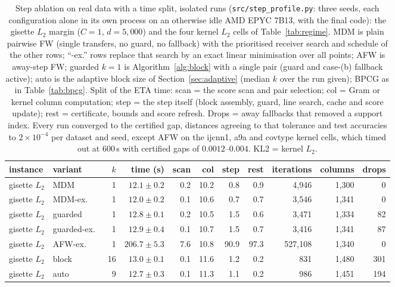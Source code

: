\begin{table}[htbp]\centering\scriptsize\setlength{\tabcolsep}{2pt}
\caption{Step ablation on real data with a time split, isolated runs
(\texttt{src/step\_profile.py}: three seeds, each configuration alone
in its own process on an otherwise idle AMD EPYC 7B13, with the final
code): the gisette $L_2$ margin ($C{=}1$, $d{=}5{,}000$) and the four
kernel $L_2$ cells of Table~\ref{tab:regime}. MDM is plain pairwise FW
(single transfers, no guard, no fallback) with the prioritised receiver
search and schedule of the other rows; ``-ex.'' rows replace that search by an exact linear
minimisation over all points; AFW is away-step FW; guarded $k{=}1$ is
Algorithm~\ref{alg:block} with a single pair (guard and case-(b)
fallback active); auto is the adaptive block size of
Section~\ref{sec:adaptive} (median $k$ over the run given); BPCG as in
Table~\ref{tab:bpcg}. Split of the ETA time: scan = the score scan and
pair selection; col = Gram or kernel column computation; step = the
step itself (block assembly, guard, line search, cache and score
update); rest = certificate, bounds and score refresh. Drops = away fallbacks that
removed a support index. Every run converged to the certified gap,
distances agreeing to that tolerance and test accuracies to
$2\times10^{-4}$ per dataset and seed, except AFW on
the ijcnn1, a9a and covtype kernel cells, which timed out at $600$\,s
with certified gaps of $0.0012$--$0.004$. KL2 = kernel $L_2$.}\label{tab:kreal}
\begin{tabular}{llrrrrrrrrr}\toprule
instance & variant & $k$ & time (s) & scan & col & step & rest & iterations & columns & drops \\\midrule
gisette $L_2$ & MDM & 1 & $12.1\pm0.2$ & 0.2 & 10.2 & 0.8 & 0.9 & 4,946 & 1,300 & 0 \\
gisette $L_2$ & MDM-ex.\ & 1 & $12.0\pm0.2$ & 0.1 & 10.6 & 0.7 & 0.7 & 3,546 & 1,341 & 0 \\
gisette $L_2$ & guarded & 1 & $12.8\pm0.1$ & 0.2 & 10.5 & 1.5 & 0.6 & 3,471 & 1,334 & 82 \\
gisette $L_2$ & guarded-ex.\ & 1 & $12.9\pm0.4$ & 0.1 & 10.7 & 1.5 & 0.7 & 3,416 & 1,341 & 87 \\
gisette $L_2$ & AFW-ex.\ & 1 & $206.7\pm5.3$ & 7.6 & 10.8 & 90.9 & 97.3 & 527,108 & 1,340 & 0 \\
gisette $L_2$ & block & 16 & $13.0\pm0.1$ & 0.1 & 11.6 & 1.2 & 0.2 & 831 & 1,480 & 301 \\
gisette $L_2$ & auto & 9 & $12.7\pm0.3$ & 0.1 & 11.3 & 1.1 & 0.2 & 986 & 1,451 & 194 \\

\end{tabular}
\end{table}
